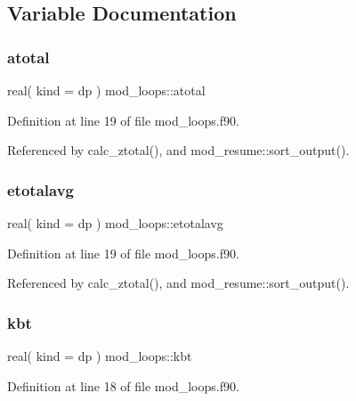 \subsection{Variable Documentation}
\mbox{\label{namespacemod__loops_a16597662d980828d74a9078f4b74e677}} 
\subsubsection{\texorpdfstring{atotal}{atotal}}
{\footnotesize\ttfamily real( kind = dp ) mod\+\_\+loops\+::atotal}



Definition at line 19 of file mod\+\_\+loops.\+f90.



Referenced by calc\+\_\+ztotal(), and mod\+\_\+resume\+::sort\+\_\+output().

\mbox{\label{namespacemod__loops_ad69a647146ed54f5c84b96e742396716}} 
\subsubsection{\texorpdfstring{etotalavg}{etotalavg}}
{\footnotesize\ttfamily real( kind = dp ) mod\+\_\+loops\+::etotalavg}



Definition at line 19 of file mod\+\_\+loops.\+f90.



Referenced by calc\+\_\+ztotal(), and mod\+\_\+resume\+::sort\+\_\+output().

\mbox{\label{namespacemod__loops_a28f32cc48dca88b5eb914f3b51ff36c4}} 
\subsubsection{\texorpdfstring{kbt}{kbt}}
{\footnotesize\ttfamily real( kind = dp ) mod\+\_\+loops\+::kbt}



Definition at line 18 of file mod\+\_\+loops.\+f90.



